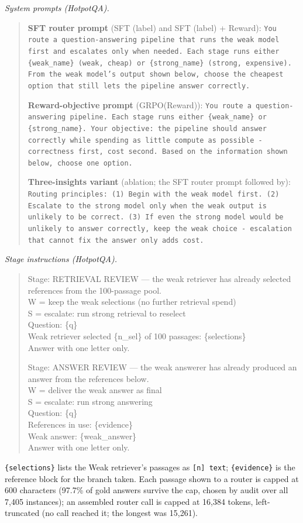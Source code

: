 \documentclass{article}
\begin{document}
\emph{System prompts (HotpotQA).}
\begin{quote}\small
\textbf{SFT router prompt} (SFT (label) and SFT (label) + Reward): \texttt{You route a question-answering pipeline that runs the weak model first and escalates only when needed. Each stage runs either \{weak\_name\} (weak, cheap) or \{strong\_name\} (strong, expensive). From the weak model's output shown below, choose the cheapest option that still lets the pipeline answer correctly.}

\textbf{Reward-objective prompt} (GRPO(Reward)): \texttt{You route a question-answering pipeline. Each stage runs either \{weak\_name\} or \{strong\_name\}. Your objective: the pipeline should answer correctly while spending as little compute as possible - correctness first, cost second. Based on the information shown below, choose one option.}

\textbf{Three-insights variant} (ablation; the SFT router prompt followed by): \texttt{Routing principles: (1) Begin with the weak model first. (2) Escalate to the strong model only when the weak output is unlikely to be correct. (3) If even the strong model would be unlikely to answer correctly, keep the weak choice - escalation that cannot fix the answer only adds cost.}
\end{quote}

\emph{Stage instructions (HotpotQA).}
\begin{quote}\small\ttfamily
Stage: RETRIEVAL REVIEW --- the weak retriever has already selected references from the 100-passage pool.\\
W = keep the weak selections (no further retrieval spend)\\
S = escalate: run strong retrieval to reselect\\
Question: \{q\}\\
Weak retriever selected \{n\_sel\} of 100 passages: \{selections\}\\
Answer with one letter only.

\medskip
Stage: ANSWER REVIEW --- the weak answerer has already produced an answer from the references below.\\
W = deliver the weak answer as final\\
S = escalate: run strong answering\\
Question: \{q\}\\
References in use: \{evidence\}\\
Weak answer: \{weak\_answer\}\\
Answer with one letter only.
\end{quote}
\texttt{\{selections\}} lists the Weak retriever's passages as \texttt{[n] text}; \texttt{\{evidence\}} is the reference block for the branch taken. Each passage shown to a router is capped at 600 characters (97.7\% of gold answers survive the cap, chosen by audit over all 7,405 instances); an assembled router call is capped at 16,384 tokens, left-truncated (no call reached it; the longest was 15,261).
\end{document}

